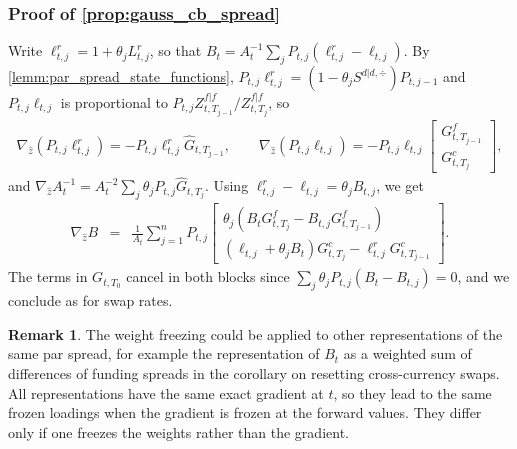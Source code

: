 \documentclass[11pt,english]{amsart}
\theoremstyle{definition}
\newtheorem{rema}{Remark}
\begin{document}
\subsubsection{Proof of \autoref{prop:gauss_cb_spread}}
Write $\ell^r_{t,j} = 1+\theta_jL^r_{t,j}$, so that $B_t = A_t^{-1}\sum_j P_{t,j}(\ell^r_{t,j} - \ell_{t,j})$. By \autoref{lemm:par_spread_state_functions}, $P_{t,j}\ell^r_{t,j} = (1-\theta_jS^{d|d,\div})P_{t,j-1}$ and $P_{t,j}\ell_{t,j}$ is proportional to $P_{t,j}Z^{f|f}_{t,T_{j-1}}/Z^{f|f}_{t,T_j}$, so
\begin{eqnarray*}
  \nabla_{\hat{z}} \left(P_{t,j}\ell^r_{t,j}\right) = - P_{t,j}\ell^r_{t,j} \hat{G}_{t,T_{j-1}}, \qquad
  \nabla_{\hat{z}} \left(P_{t,j}\ell_{t,j}\right) = - P_{t,j}\ell_{t,j} \begin{bmatrix} G^f_{t,T_{j-1}} \\ G^c_{t,T_j} \end{bmatrix} ,
\end{eqnarray*}
and $\nabla_{\hat{z}} A_t^{-1} = A_t^{-2}\sum_j\theta_jP_{t,j}\hat{G}_{t,T_j}$. Using $\ell^r_{t,j} - \ell_{t,j} = \theta_jB_{t,j}$, we get
\begin{eqnarray*}
  \nabla_{\hat{z}} B &=& \frac{1}{A_t} \sum_{j=1}^n P_{t,j} \begin{bmatrix} \theta_j \left( B_t G^f_{t,T_j} - B_{t,j} G^f_{t,T_{j-1}} \right) \\ (\ell_{t,j} + \theta_jB_t) G^c_{t,T_j} - \ell^r_{t,j} G^c_{t,T_{j-1}} \end{bmatrix} .
\end{eqnarray*}
The terms in $G_{t,T_0}$ cancel in both blocks since $\sum_j\theta_jP_{t,j}(B_t - B_{t,j}) = 0$, and we conclude as for swap rates.

\begin{rema}
The weight freezing could be applied to other representations of the same par spread, for example the representation of $B_t$ as a weighted sum of differences of funding spreads in the corollary on resetting cross-currency swaps. All representations have the same exact gradient at $t$, so they lead to the same frozen loadings when the gradient is frozen at the forward values. They differ only if one freezes the weights rather than the gradient.
\end{rema}
\end{document}
